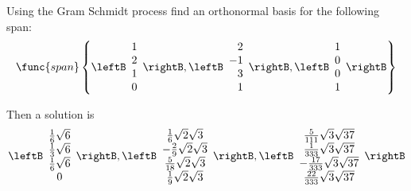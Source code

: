 \begin{enumialphparenastyle}
\begin{ex} Using the Gram Schmidt process find an
orthonormal basis for the following span:
\[
\func{span}\left\{ \leftB
\begin{array}{r}
 1 \\
2 \\
1 \\
0
\end{array}
\rightB
,\leftB
\begin{array}{r} 
2 \\
-1 \\
3 \\
1
\end{array}
\rightB , \leftB
\begin{array}{r}
 1 \\
0 \\
0 \\
1
\end{array}
\rightB \right\}
\]
\begin{sol}
Then a solution is
\[
\leftB
\begin{array}{c}
\frac{1}{6}\sqrt{6} \\
\frac{1}{3}\sqrt{6} \\
\frac{1}{6}\sqrt{6} \\
0
\end{array}
\rightB ,\leftB
\begin{array}{c}
\frac{1}{6}\sqrt{2}\sqrt{3} \\
-\frac{2}{9}\sqrt{2}\sqrt{3} \\
\frac{5}{18}\sqrt{2}\sqrt{3} \\
\frac{1}{9}\sqrt{2}\sqrt{3}
\end{array}
\rightB ,\leftB
\begin{array}{c}
\frac{5}{111}\sqrt{3}\sqrt{37} \\
\frac{1}{333}\sqrt{3}\sqrt{37} \\
-\frac{17}{333}\sqrt{3}\sqrt{37} \\
\frac{22}{333}\sqrt{3}\sqrt{37}
\end{array}
\rightB
\]
\end{sol}
\end{ex}


\end{enumialphparenastyle}

